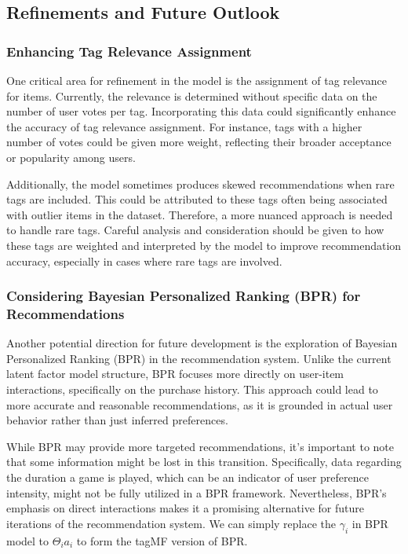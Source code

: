 \documentclass[sigplan,screen]{acmart}
\begin{document}
\subsection{Refinements and Future Outlook}

\subsubsection{Enhancing Tag Relevance Assignment}
One critical area for refinement in the model is the assignment of tag relevance for items. Currently, the relevance is determined without specific data on the number of user votes per tag. Incorporating this data could significantly enhance the accuracy of tag relevance assignment. For instance, tags with a higher number of votes could be given more weight, reflecting their broader acceptance or popularity among users.

Additionally, the model sometimes produces skewed recommendations when rare tags are included. This could be attributed to these tags often being associated with outlier items in the dataset. Therefore, a more nuanced approach is needed to handle rare tags. Careful analysis and consideration should be given to how these tags are weighted and interpreted by the model to improve recommendation accuracy, especially in cases where rare tags are involved.

\subsubsection{Considering Bayesian Personalized Ranking (BPR) for Recommendations}
Another potential direction for future development is the exploration of Bayesian Personalized Ranking (BPR) in the recommendation system. Unlike the current latent factor model structure, BPR focuses more directly on user-item interactions, specifically on the purchase history. This approach could lead to more accurate and reasonable recommendations, as it is grounded in actual user behavior rather than just inferred preferences.

While BPR may provide more targeted recommendations, it's important to note that some information might be lost in this transition. Specifically, data regarding the duration a game is played, which can be an indicator of user preference intensity, might not be fully utilized in a BPR framework. Nevertheless, BPR's emphasis on direct interactions makes it a promising alternative for future iterations of the recommendation system. We can simply replace the $\gamma_i$ in BPR model to $\Theta_ia_i$ to form the tagMF version of BPR.
\end{document}

